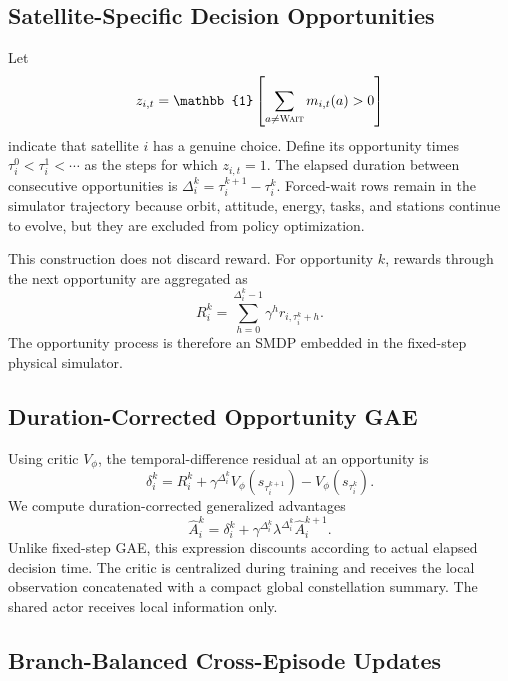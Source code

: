 \documentclass[letterpaper]{article}
\begin{document}
\subsection{Satellite-Specific Decision Opportunities}

Let
\begin{equation}
 z_{i,t}=\mathbb{1}\left[\sum_{a\neq \textsc{Wait}}m_{i,t}(a)>0\right]
\end{equation}
indicate that satellite $i$ has a genuine choice.  Define its opportunity times $\tau_i^0<\tau_i^1<\cdots$ as the steps for which $z_{i,t}=1$.  The elapsed duration between consecutive opportunities is
$\Delta_i^k=\tau_i^{k+1}-\tau_i^k$.
Forced-wait rows remain in the simulator trajectory because orbit, attitude, energy, tasks, and stations continue to evolve, but they are excluded from policy optimization.

This construction does not discard reward.  For opportunity $k$, rewards through the next opportunity are aggregated as
\begin{equation}
 R_i^k=\sum_{h=0}^{\Delta_i^k-1}\gamma^h r_{i,\tau_i^k+h}.
\end{equation}
The opportunity process is therefore an SMDP embedded in the fixed-step physical simulator.

\subsection{Duration-Corrected Opportunity GAE}

Using critic $V_\phi$, the temporal-difference residual at an opportunity is
\begin{equation}
 \delta_i^k=R_i^k+\gamma^{\Delta_i^k}V_\phi(s_{\tau_i^{k+1}})-V_\phi(s_{\tau_i^k}).
\end{equation}
We compute duration-corrected generalized advantages
\begin{equation}
 \hat A_i^k=\delta_i^k+
 \gamma^{\Delta_i^k}\lambda^{\Delta_i^k}\hat A_i^{k+1}.
\end{equation}
Unlike fixed-step GAE, this expression discounts according to actual elapsed decision time.  The critic is centralized during training and receives the local observation concatenated with a compact global constellation summary.  The shared actor receives local information only.

\subsection{Branch-Balanced Cross-Episode Updates}
\end{document}
